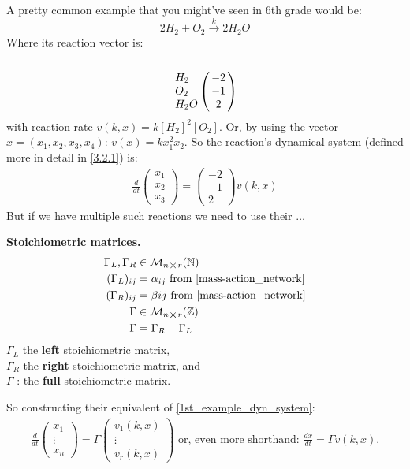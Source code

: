 A pretty common example that you might've seen in 6th grade would be:
\[
	2H_2 + O_2 \xrightarrow{k} 2H_2O
\]
Where its reaction vector is:
\[
	\bordermatrix{\cr \cr
		H_2 & -2 \cr
		O_2 & -1 \cr
		H_2O & 2 \cr
	}
\]
with reaction rate $v(k,x) = k[H_2]^2[O_2]$. Or, by using the vector $x=(x_1, x_2, x_3, x_4)$: $v(x) = k x_1^2 x_2$.
So the reaction's dynamical system (defined more in detail in \ref{3.2.1}) is:
\begin{align}\label{1st_example_dyn_system}
	\frac{d}{dt}
	\begin{pmatrix*}
		x_1 \\
		x_2 \\
		x_3
	\end{pmatrix*} =
	\begin{pmatrix}
		-2 \\
		-1 \\
		2
	\end{pmatrix}
	v(k,x)
\end{align}
But if we have multiple such reactions we need to use their $\ldots$
\begin{definition}
	\textbf{Stoichiometric matrices.}
	\begin{align*}
		\Gamma_L, \Gamma_R &\in \mathcal{M}_{n \bigtimes r}(\mathbb{N}) \\
		(\Gamma_L)_{ij} &= \alpha_{ij} \text{ from \ref{mass-action_network}} \\
		(\Gamma_R)_{ij} &= \beta{ij} \text{ from \ref{mass-action_network}} \\
		\Gamma &\in \mathcal{M}_{n \bigtimes r}(\mathbb{Z}) \\
		\Gamma &= \Gamma_R - \Gamma_L
	\end{align*}
	$\Gamma_L$ the \textbf{left} stoichiometric matrix, \\
	$\Gamma_R$ the \textbf{right} stoichiometric matrix, and \\
	$\Gamma$ : the \textbf{full} stoichiometric matrix.
\end{definition}
So constructing their equivalent of \ref{1st_example_dyn_system}:
\begin{align}\label{crn_system_matrix_form}
	\frac{d}{dt}
	\begin{pmatrix*}
		x_1 \\
		\vdots \\
		x_n
	\end{pmatrix*} = \Gamma
	\begin{pmatrix*}
		v_1(k,x)	 \\
		\vdots \\
		v_r(k,x)
	\end{pmatrix*}
	\text{ or, even more shorthand:  }
	\frac{dx}{dt} = \Gamma v(k,x).
\end{align}
